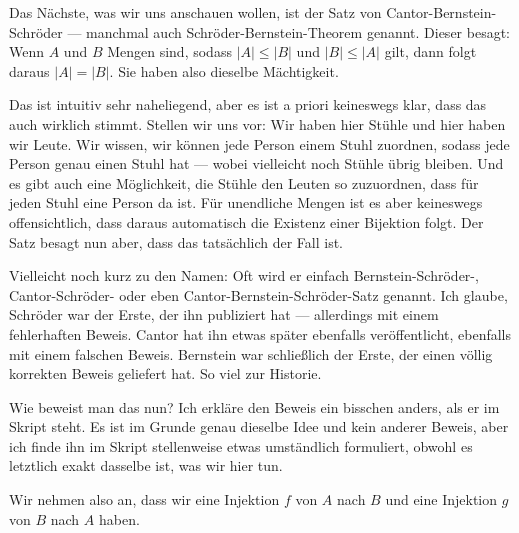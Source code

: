 \begin{math-stroke}
\end{math-stroke}

\begin{spoken-clean}[00:23:33 - 00:24:22]
Das Nächste, was wir uns anschauen wollen, ist der Satz von Cantor-Bernstein-Schröder --- manchmal auch Schröder-Bernstein-Theorem genannt. Dieser besagt: Wenn $A$ und $B$ Mengen sind, sodass $|A| \le |B|$ und $|B| \le |A|$ gilt, dann folgt daraus $|A| = |B|$. Sie haben also dieselbe Mächtigkeit.

Das ist intuitiv sehr naheliegend, aber es ist a priori keineswegs klar, dass das auch wirklich stimmt. Stellen wir uns vor: Wir haben hier Stühle und hier haben wir Leute. Wir wissen, wir können jede Person einem Stuhl zuordnen, sodass jede Person genau einen Stuhl hat --- wobei vielleicht noch Stühle übrig bleiben. Und es gibt auch eine Möglichkeit, die Stühle den Leuten so zuzuordnen, dass für jeden Stuhl eine Person da ist. Für unendliche Mengen ist es aber keineswegs offensichtlich, dass daraus automatisch die Existenz einer Bijektion folgt. Der Satz besagt nun aber, dass das tatsächlich der Fall ist.

Vielleicht noch kurz zu den Namen: Oft wird er einfach Bernstein-Schröder-, Cantor-Schröder- oder eben Cantor-Bernstein-Schröder-Satz genannt. Ich glaube, Schröder war der Erste, der ihn publiziert hat --- allerdings mit einem fehlerhaften Beweis. Cantor hat ihn etwas später ebenfalls veröffentlicht, ebenfalls mit einem falschen Beweis. Bernstein war schließlich der Erste, der einen völlig korrekten Beweis geliefert hat. So viel zur Historie.

Wie beweist man das nun? Ich erkläre den Beweis ein bisschen anders, als er im Skript steht. Es ist im Grunde genau dieselbe Idee und kein anderer Beweis, aber ich finde ihn im Skript stellenweise etwas umständlich formuliert, obwohl es letztlich exakt dasselbe ist, was wir hier tun.

Wir nehmen also an, dass wir eine Injektion $f$ von $A$ nach $B$ und eine Injektion $g$ von $B$ nach $A$ haben.
\end{spoken-clean}

